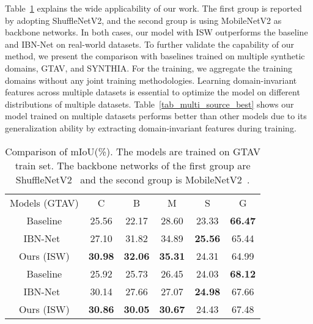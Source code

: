 \documentclass[final]{latex/cvpr}
\newcommand{\drule}{\specialrule{0.2pt}{1pt}{1pt}\specialrule{0.2pt}{0pt}{\belowrulesep}}
\begin{document}
Table~\ref{tab_various_backbone_cityscapes} explains the wide applicability of our work. The first group is reported by adopting ShuffleNetV2, and the second group is using MobileNetV2 as backbone networks. In both cases, our model with ISW outperforms the baseline and IBN-Net on real-world datasets.
To further validate the capability of our method, we present the comparison with baselines trained on multiple synthetic domains, GTAV, and SYNTHIA. For the training, we aggregate the training domains without any joint training methodologies.
Learning domain-invariant features across multiple datasets is essential to optimize the model on different distributions of multiple datasets. Table~\ref{tab_multi_source_best} shows our model trained on multiple datasets performs better than other models due to its generalization ability by extracting domain-invariant features during training.


\begin{table}[t!]
\vspace*{-0.0cm}
\begin{center}
\setlength\tabcolsep{5.2pt}
\footnotesize
\begin{tabular}{c|c|c|c|c||c}
\toprule
Models (GTAV) & C & B & M & S & G \\
\drule
Baseline              & 25.56      & 22.17      & 28.60      & 23.33      & \textbf{66.47} \\
\midrule
IBN-Net~\cite{pan2018two} & 27.10     & 31.82 & 34.89      & \textbf{25.56}      & 65.44      \\
\midrule
Ours (ISW)                & \textbf{30.98} & \textbf{32.06}      & \textbf{35.31} & 24.31 & 64.99      \\
\toprule
Baseline              & 25.92      & 25.73      & 26.45  & 24.03      & \textbf{68.12} \\
\midrule
IBN-Net~\cite{pan2018two} & 30.14      & 27.66      & 27.07      & \textbf{24.98}      & 67.66      \\
\midrule
Ours (ISW)              & \textbf{30.86} & \textbf{30.05} & \textbf{30.67} & 24.43 & 67.48      \\
\bottomrule
\end{tabular}
\end{center}
\vspace*{-0.15cm}
\caption{Comparison of mIoU(\%). The models are trained on GTAV train set. The backbone networks of the first group are ShuffleNetV2~\cite{ma2018shufflenet} and the second group is MobileNetV2~\cite{sandler2018mobilenetv2}.}\label{tab_various_backbone_cityscapes}
\vspace*{-0.55cm}
\end{table}
\end{document}
